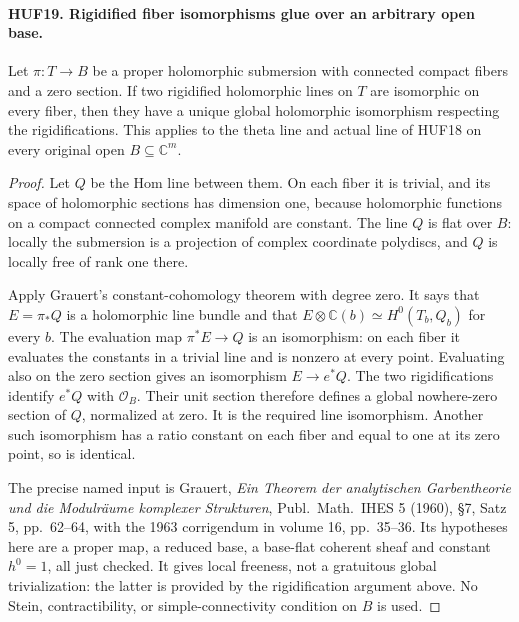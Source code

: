 \documentclass[11pt,a4paper]{article}
\numberwithin{equation}{section}
\theoremstyle{remark}\newtheorem{remark}[theorem]{Remark}
\begin{document}
\paragraph{HUF19. Rigidified fiber isomorphisms glue over an arbitrary open base.}
\label{claim:HUF19}
Let \(\pi:T\to B\) be a proper holomorphic
submersion with connected compact fibers and
a zero section.  If two rigidified holomorphic
lines on \(T\) are isomorphic on every fiber,
then they have a unique global holomorphic
isomorphism respecting the rigidifications.
This applies to the theta line and actual
line of HUF18 on every original open
\(B\subseteq\mathbb C^m\).

\begin{proof}
Let \(Q\) be the Hom line between them.
On each fiber it is trivial, and its space
of holomorphic sections has dimension one,
because holomorphic functions on a compact
connected complex manifold are constant.
The line \(Q\) is flat over \(B\): locally
the submersion is a projection of complex
coordinate polydiscs, and \(Q\) is locally
free of rank one there.

Apply Grauert's constant-cohomology theorem
with degree zero.  It says that
\(E=\pi_*Q\) is a holomorphic line bundle
and that \(E\otimes\mathbb C(b)\simeq
H^0(T_b,Q_b)\) for every \(b\).
The evaluation map \(\pi^*E\to Q\) is
an isomorphism: on each fiber it evaluates
the constants in a trivial line and is
nonzero at every point.  Evaluating also
on the zero section gives an isomorphism
\(E\to e^*Q\).  The two rigidifications
identify \(e^*Q\) with \(\mathcal O_B\).
Their unit section therefore defines a
global nowhere-zero section of \(Q\),
normalized at zero.  It is the required
line isomorphism.  Another such isomorphism
has a ratio constant on each fiber and
equal to one at its zero point, so is
identical.

The precise named input is Grauert,
\emph{Ein Theorem der analytischen
Garbentheorie und die Modulr\"aume komplexer
Strukturen}, Publ.\ Math.\ IHES 5 (1960),
\S7, Satz 5, pp.\ 62--64, with the 1963
corrigendum in volume 16, pp.\ 35--36.
Its hypotheses here are a proper map,
a reduced base, a base-flat coherent sheaf
and constant \(h^0=1\), all just checked.
It gives local freeness, not a gratuitous
global trivialization: the latter is
provided by the rigidification argument
above.  No Stein, contractibility, or
simple-connectivity condition on \(B\)
is used.
\end{proof}

\end{document}
